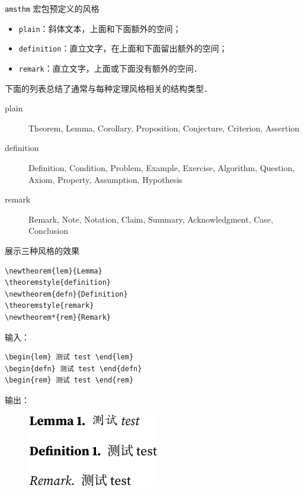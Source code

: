 \documentclass[aspectratio=169,fontset=none]{ctexbeamer}
\newcommand{\pkg}[1]{\texttt{#1}}
\begin{document}
  \begin{frame}[fragile]{\pkg{amsthm} 宏包预定义的风格}
    \begin{itemize}
      \item \texttt{plain}：斜体文本，上面和下面额外的空间；
      \item \texttt{definition}：直立文字，在上面和下面留出额外的空间；
      \item \texttt{remark}：直立文字，上面或下面没有额外的空间．
    \end{itemize}
    下面的列表总结了通常与每种定理风格相关的结构类型．
    \begin{description}
      \item[plain] Theorem, Lemma, Corollary, Proposition, Conjecture, Criterion, Assertion
      \item[definition] Definition, Condition, Problem, Example, Exercise, Algorithm, Question, Axiom, Property, Assumption, Hypothesis
      \item[remark] Remark, Note, Notation, Claim, Summary, Acknowledgment, Case, Conclusion
    \end{description}
  \end{frame}

  \begin{frame}[fragile]{展示三种风格的效果}
    \begin{minipage}{\textwidth}
    \begin{verbatim}
\newtheorem{lem}{Lemma}
\theoremstyle{definition}
\newtheorem{defn}{Definition}
\theoremstyle{remark}
\newtheorem*{rem}{Remark}
    \end{verbatim}
    \end{minipage}
    \vskip 5pt
    \begin{minipage}[t]{0.6\textwidth}
    输入：
    \begin{verbatim}
\begin{lem} 测试 test \end{lem}
\begin{defn} 测试 test \end{defn}
\begin{rem} 测试 test \end{rem}
    \end{verbatim}
    \end{minipage}%
    \begin{minipage}[t]{0.4\textwidth}
    输出：
      \begin{figure}
        \centering
        \includegraphics{material/三种定理风格.pdf}
      \end{figure}
    \end{minipage}
  \end{frame}
\end{document}
